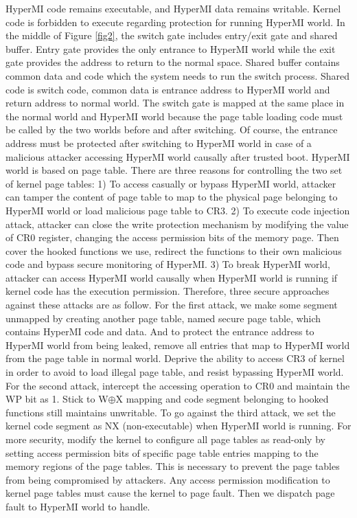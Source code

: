 \documentclass[conference]{IEEEtran}
\begin{document}
HyperMI code remains executable, and HyperMI data remains writable. Kernel code is forbidden to execute regarding protection for running HyperMI world. 
In the middle of Figure \ref{fig2}, the switch gate includes entry/exit gate and shared buffer. Entry gate provides the only entrance to HyperMI world while the exit gate provides the address to return to the normal space. Shared buffer contains common data and code which the system needs to run the switch process. Shared code is switch code, common data is entrance address to HyperMI world and return address to normal world. The switch gate is mapped at the same place in the normal world and HyperMI world because the page table loading code must be called by the two worlds before and after switching. Of course, the entrance address must be protected after switching to HyperMI world in case of a malicious attacker accessing HyperMI world causally after trusted boot. 
HyperMI world is based on page table. There are three reasons for controlling the two set of kernel page tables: 1) To access casually or bypass HyperMI world, attacker can tamper the content of page table to map to the physical page belonging to HyperMI world or load malicious page table to CR3. 2) To execute code injection attack, attacker can close the write protection mechanism by modifying the value of CR0 register, changing the access permission bits of the memory page. Then cover the hooked functions we use, redirect the functions to their own malicious code and bypass secure monitoring of HyperMI. 3) To break HyperMI world, attacker can access HyperMI world causally when HyperMI world is running if kernel code has the execution permission. Therefore, three secure approaches against these attacks are as follow.
For the first attack, we make some segment unmapped by creating another page table, named secure page table, which contains HyperMI code and data. And to protect the entrance address to HyperMI world from being leaked,
remove all entries that map to HyperMI world from the page table in normal world. Deprive the ability to access CR3 of kernel in order to avoid to load illegal page table, and resist bypassing HyperMI world.
For the second attack, intercept the accessing operation to CR0 and maintain the WP bit as 1. Stick to W$\oplus${X} mapping and code segment belonging to hooked functions still maintains unwritable.
To go against the third attack, we set the kernel code segment as NX (non-executable) when HyperMI world is running. For more security, modify the kernel to configure all page tables as read-only by setting access permission bits of specific page table entries mapping to the memory regions of the page tables. This is necessary to prevent the page tables from being compromised by attackers. Any access permission modification to kernel page tables must cause the kernel to page fault. Then we dispatch page fault to HyperMI world to handle.
\end{document}
